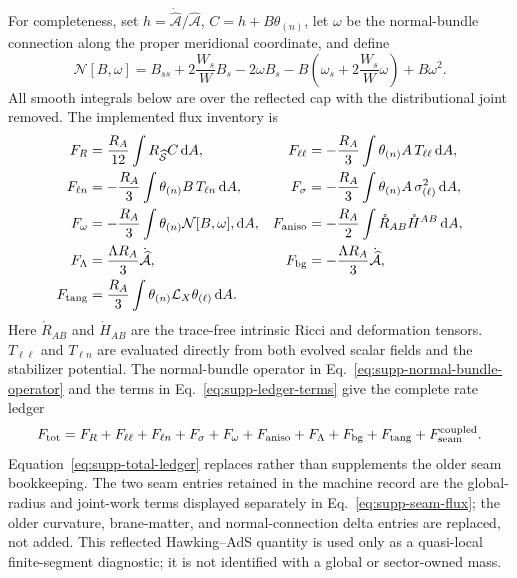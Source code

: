 \documentclass[11pt]{article}
\newcommand{\dd}{\mathrm{d}}
\begin{document}
For completeness, set
$h=\dot{\widehat{\mathcal A}}/\widehat{\mathcal A}$,
$C=h+B\theta_{(n)}$, let $\omega$ be the normal-bundle connection along the
proper meridional coordinate, and define
\begin{equation}
\mathcal N[B,\omega]
=B_{ss}+2\frac{W_s}{W}B_s-2\omega B_s
-B\left(\omega_s+2\frac{W_s}{W}\omega\right)+B\omega^2.
\label{eq:supp-normal-bundle-operator}
\end{equation}
All smooth integrals below are over the reflected cap with the distributional
joint removed.  The implemented flux inventory is
\begin{align}
F_{R}&=\frac{R_A}{12}\int R_{\widehat{\mathcal S}}C\,\dd A,
&
F_{\ell\ell}&=-\frac{R_A}{3}\int
\theta_{(n)}A\,T_{\ell\ell}\,\dd A,
\nonumber\\
F_{\ell n}&=-\frac{R_A}{3}\int
\theta_{(n)}B\,T_{\ell n}\,\dd A,
&
F_{\sigma}&=-\frac{R_A}{3}\int
\theta_{(n)}A\,\sigma_{(\ell)}^2\,\dd A,
\nonumber\\
F_{\omega}&=-\frac{R_A}{3}\int
\theta_{(n)}\mathcal N[B,\omega],\dd A,
&
F_{\rm aniso}&=-\frac{R_A}{2}\int
\mathring R_{AB}\mathring H^{AB}\,\dd A,
\nonumber\\
F_{\Lambda}&=\frac{\Lambda R_A}{3}
\dot{\widehat{\mathcal A}},
&
F_{\rm bg}&=-\frac{\Lambda R_A}{3}
\dot{\widehat{\mathcal A}},
\nonumber\\
F_{\rm tang}&=\frac{R_A}{3}\int
\theta_{(n)}\mathcal L_X\theta_{(\ell)}\,\dd A.
\label{eq:supp-ledger-terms}
\end{align}
Here $\mathring R_{AB}$ and $\mathring H_{AB}$ are the trace-free intrinsic
Ricci and deformation tensors.  $T_{\ell\ell}$ and $T_{\ell n}$ are evaluated
directly from both evolved scalar fields and the stabilizer potential.  The
normal-bundle operator in Eq.~\eqref{eq:supp-normal-bundle-operator} and the
terms in Eq.~\eqref{eq:supp-ledger-terms} give the complete rate ledger
\begin{equation}
F_{\rm tot}=F_R+F_{\ell\ell}+F_{\ell n}+F_\sigma+F_\omega
+F_{\rm aniso}+F_\Lambda+F_{\rm bg}+F_{\rm tang}
+F_{\rm seam}^{\rm coupled}.
\label{eq:supp-total-ledger}
\end{equation}
Equation~\eqref{eq:supp-total-ledger} replaces rather than supplements the
older seam bookkeeping.  The two seam entries retained in the machine record are the global-radius and
joint-work terms displayed separately in Eq.~\eqref{eq:supp-seam-flux}; the
older curvature, brane-matter, and normal-connection delta entries are
replaced, not added.  This reflected Hawking--AdS quantity is used only as a
quasi-local finite-segment diagnostic; it is not identified with a global or
sector-owned mass.
\end{document}

